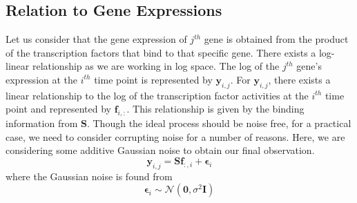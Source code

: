 \subsection{Relation to Gene Expressions}
Let us consider that the gene expression of $j^{th}$ gene is obtained from the product of the transcription factors that bind to that specific gene. There exists a log-linear relationship as we are working in log space. The log of the $j^{th}$ gene's expression at the $i^{th}$ time point is represented by $\mathbf{y}_{i,j}$. For $\mathbf{y}_{i,j}$, there exists a linear relationship to the log of the transcription factor activities at the $i^{th}$ time point and represented by $\mathbf{f}_{i, :}$. This relationship is given by the binding information from $\mathbf{S}$. Though the ideal process should be noise free, for a practical case, we need to consider corrupting noise for a number of reasons. Here, we are considering some additive Gaussian noise to obtain our final observation.
\begin{equation} \label{eq:yij}
\mathbf{y}_{i, j} = \mathbf{S}\mathbf{f}_{:, i} + \boldsymbol{\epsilon}_i
\end{equation}  
where the Gaussian noise is found from
\begin{equation} \label{eq:epsi}
\boldsymbol{\epsilon}_i \sim \mathcal{N}(\mathbf{0}, \sigma^2 \mathbf{I})
\end{equation}


